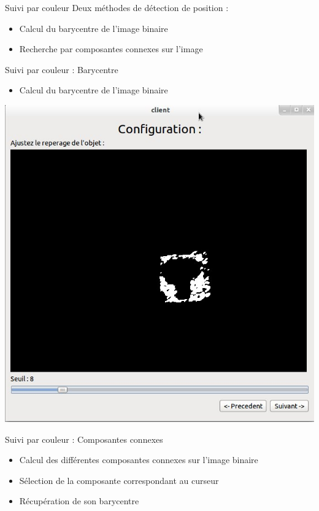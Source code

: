 \documentclass{beamer}
\begin{document}
		\begin{frame}{Suivi par couleur}
			Deux méthodes de détection de position :
			\begin{itemize}
				\item{Calcul du barycentre de l'image binaire}
				\item{Recherche par composantes connexes sur l'image}
			\end{itemize}
		\end{frame}

		\begin{frame}{Suivi par couleur : Barycentre}
			\begin{itemize}
				\item{Calcul du barycentre de l'image binaire}
			\end{itemize}
			\begin{center}
				\includegraphics[scale=0.25]{capture1.jpg}
			\end{center}
		\end{frame}

		\begin{frame}{Suivi par couleur : Composantes connexes}
			\begin{itemize}
				\item{Calcul des différentes composantes connexes sur l'image binaire}
				\item{Sélection de la composante correspondant au curseur}
				\item{Récupération de son barycentre} 
			\end{itemize}
		\end{frame}
\end{document}

